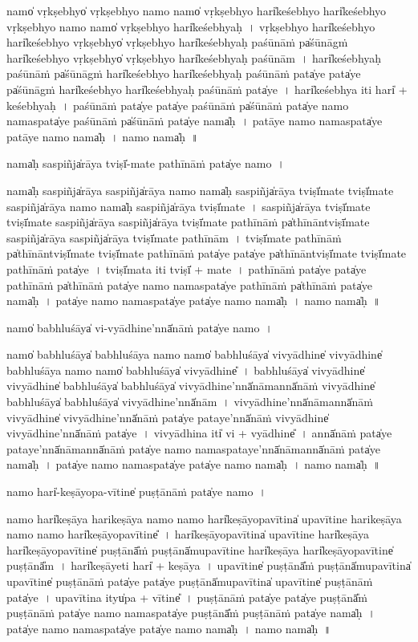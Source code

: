 \documentclass[parskip, DIV=14]{scrartcl}
\begin{document}
{namo̍ vṛ॒kṣebhyo̍ vṛ॒kṣebhyo॒ namo॒ namo̍ vṛ॒kṣebhyo॒ hari̍keśebhyo॒ hari̍keśebhyo vṛ॒kṣebhyo॒ namo॒ namo̍ vṛ॒kṣebhyo॒ hari̍keśebhyaḥ~।
vṛ॒kṣebhyo॒ hari̍keśebhyo॒ hari̍keśebhyo vṛ॒kṣebhyo̍ vṛ॒kṣebhyo॒ hari̍keśebhyaḥ paśū॒nāṁ pa̍śū॒nāgṁ hari̍keśebhyo vṛ॒kṣebhyo̍ vṛ॒kṣebhyo॒ hari̍keśebhyaḥ paśū॒nām~।
hari̍keśebhyaḥ paśū॒nāṁ pa̍śū॒nāgṁ hari̍keśebhyo॒ hari̍keśebhyaḥ paśū॒nāṁ pata̍ye॒ pata̍ye pa̍śū॒nāgṁ hari̍keśebhyo॒ hari̍keśebhyaḥ paśū॒nāṁ pata̍ye~।
hari̍keśebhya iti॒ hari̍ + ke॒śe॒bhya॒ḥ~।
pa॒śū॒nāṁ pata̍ye॒ pata̍ye paśū॒nāṁ  pa̍śū॒nāṁ pata̍ye॒ namo॒ nama॒spata̍ye paśū॒nāṁ pa̍śū॒nāṁ pata̍ye॒ nama̍ḥ~। 
patāye॒ namo॒ nama॒spata̍ye॒ patāye॒ namo॒ nama̍ḥ~।  
namo॒ nama̍ḥ~॥ 

\vspace{0.5cm}
nama̍ḥ sa॒spiñja̍rāya॒ tviṣī̍-mate pathī॒nāṁ  pata̍ye॒ namo॒~।

nama̍ḥ sa॒spiñja̍rāya sa॒spiñja̍rāya॒ namo॒ nama̍ḥ sa॒spiñja̍rāya॒ tviṣī̍mate॒ tviṣī̍mate sa॒spiñja̍rāya॒ namo॒ nama̍ḥ sa॒spiñja̍rāya॒ tviṣī̍mate~।
sa॒spiñja̍rāya॒ tviṣī̍mate॒ tviṣī̍mate sa॒spiñja̍rāya sa॒spiñja̍rāya॒ tviṣī̍mate pathī॒nāṁ pa̍thī॒nāntviṣī̍mate sa॒spiñja̍rāya sa॒spiñja̍rāya॒ tviṣī̍mate pathī॒nām~।
tviṣī̍mate pathī॒nāṁ pa̍thī॒nāntviṣī̍mate॒ tviṣī̍mate pathī॒nāṁ pata̍ye॒ pata̍ye pa̍thī॒nāntviṣī̍mate॒ tviṣī̍mate pathī॒nāṁ pata̍ye~।
tviṣī̍mata॒ iti॒ tviṣī̍ + ma॒te॒~।
pa॒thī॒nāṁ pata̍ye॒ pata̍ye pathī॒nāṁ pa̍thī॒nāṁ pata̍ye॒ namo॒ nama॒spata̍ye pathī॒nāṁ pa̍thī॒nāṁ pata̍ye॒ nama̍ḥ~।
pata̍ye॒ namo॒ nama॒spata̍ye॒ pata̍ye॒ namo॒ nama̍ḥ~।
namo॒ nama̍ḥ~॥ 

\vspace{0.5cm}
namo̍  babhlu॒śāya̍ vi-vyā॒dhine'nnā̍nā॒ṁ pata̍ye॒ namo॒~।

namo̍ babhlu॒śāya̍ babhlu॒śāya॒ namo॒ namo̍ babhlu॒śāya̍ vivyā॒dhine̍ vivyā॒dhine̍ babhlu॒śāya॒ namo॒ namo̍ babhlu॒śāya̍ vivyā॒dhine̎~।
ba॒bhlu॒śāya̍ vivyā॒dhine̍ vivyā॒dhine̍ babhlu॒śāya̍ babhlu॒śāya̍ vivyā॒dhine'nnā̍nā॒mannā̍nāṁ vivyā॒dhine̍ babhlu॒śāya̍ babhlu॒śāya̍ vivyā॒dhine'nnā̍nām~।
vi॒vyā॒dhine'nnā̍nā॒mannā̍nāṁ vivyā॒dhine̍ vivyā॒dhine'nnā̍nā॒ṁ pata̍ye॒ pata॒ye'nnā̍nāṁ vivyā॒dhine̍ vivyā॒dhine'nnā̍nā॒ṁ pata̍ye~।
vi॒vyā॒dhina॒ iti̍ vi + vyā॒dhine̎~।
annā̍nā॒ṁ pata̍ye॒ pata॒ye'nnā̍nā॒mannā̍nā॒ṁ pata̍ye॒ namo॒ nama॒spata॒ye'nnā̍nā॒mannā̍nā॒ṁ pata̍ye॒ nama̍ḥ~।
pata̍ye॒ namo॒ nama॒spata̍ye॒ pata̍ye॒ namo॒ nama̍ḥ~।
namo॒ nama̍ḥ~॥ 

\vspace{0.5cm}
namo॒  hari̍-keṣāyopa-vī॒tine̍ pu॒ṣṭānā॒ṁ pata̍ye॒ namo॒~।

namo॒ hari̍keṣāya॒ harikeṣāya॒ namo॒ namo॒ hari̍keṣāyopavī॒tina̍ upavī॒tine॒  harikeṣāya॒ namo॒ namo॒ hari̍keṣāyopavī॒tine̎~।
hari̍keṣāyopavī॒tina̍ upavī॒tine॒ hari̍keṣāya॒ hari̍keṣāyopavī॒tine̍ pu॒ṣṭānā̎ṁ pu॒ṣṭānā̍mupavī॒tine॒ hari̍keṣāya॒ hari̍keṣāyopavī॒tine̍ pu॒ṣṭānā̎m~।
hari̍keṣā॒yeti॒ hari̍ + ke॒ṣā॒ya॒~।
u॒pa॒vī॒tine̍ pu॒ṣṭānā̎ṁ pu॒ṣṭānā̍mupavī॒tina̍ upavī॒tine̍ pu॒ṣṭānā॒ṁ pata̍ye॒ pata̍ye pu॒ṣṭānā̍mupavī॒tina̍ upavī॒tine̍ pu॒ṣṭānā॒ṁ pata̍ye~।
u॒pa॒vī॒tina॒ ityu̍pa + vī॒tine̎~।
pu॒ṣṭānā॒ṁ pata̍ye॒ pata̍ye pu॒ṣṭānā̎ṁ pu॒ṣṭānā॒ṁ pata̍ye॒ namo॒ nama॒spata̍ye pu॒ṣṭānā̎ṁ pu॒ṣṭānā॒ṁ pata̍ye॒ nama̍ḥ~।
pata̍ye॒ namo॒ nama॒spata̍ye॒ pata̍ye॒ namo॒ nama̍ḥ~।
namo॒ nama̍ḥ~॥ 

}
\end{document}
